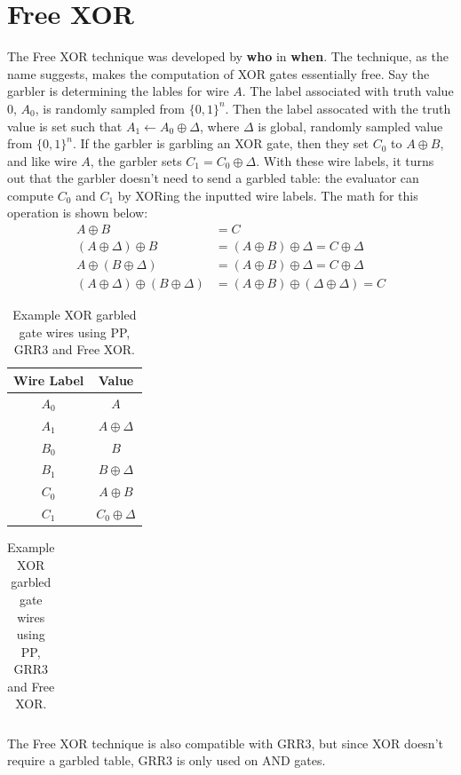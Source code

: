 \documentclass[12pt,twoside]{reedthesis}
\begin{document}
\section{Free XOR}
The Free XOR technique was developed by \textbf{who} in \textbf{when}.
The technique, as the name suggests, makes the computation of XOR gates essentially free.
Say the garbler is determining the lables for wire $A$.
The label associated with truth value $0$, $A_0$, is randomly sampled from $\{0,1\}^n$. 
Then the label assocated with the truth value is set such that $A_1 \gets A_0 \oplus \Delta$, where $\Delta$ is global, randomly sampled value from $\{0,1\}^n$.
If the garbler is garbling an XOR gate, then they set $C_0$ to $A \oplus B$, and like wire $A$, the garbler sets $C_1 = C_0 \oplus \Delta$.
With these wire labels, it turns out that the garbler doesn't need to send a garbled table: the evaluator can compute $C_0$ and $C_1$ by XORing the inputted wire labels.
The math for this operation is shown below:
\begin{align*}
    A \oplus B & = C \\
    (A \oplus \Delta) \oplus B & = (A \oplus B) \oplus \Delta = C \oplus \Delta \\
    A \oplus (B \oplus \Delta) & = (A \oplus B) \oplus \Delta = C \oplus \Delta \\
    (A \oplus \Delta) \oplus (B \oplus \Delta) & = (A \oplus B) \oplus (\Delta \oplus  \Delta) = C 
\end{align*}

\begin{table}[h]
    \centering
    \begin{tabular}{|c|c|}
    \hline
    Wire Label & Value\\
    \hline
    $A_0$ & $A$ \\
    $A_1$ & $A \oplus \Delta$ \\
    $B_0$ & $B$ \\
    $B_1$ & $B \oplus \Delta$ \\
    $C_0$ & $A \oplus B$ \\
    $C_1$ & $C_0 \oplus \Delta$ \\
    \hline
    \end{tabular}
    \qquad
    \begin{tabular}{|c|}
    \hline
    \hline
    \end{tabular}
    \caption{Example XOR garbled gate wires using PP, GRR3 and Free XOR.}
\end{table}

The Free XOR technique is also compatible with GRR3, but since XOR doesn't require a garbled table, GRR3 is only used on AND gates.
\end{document}
